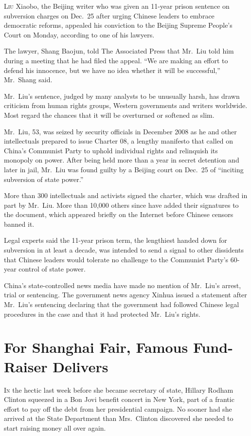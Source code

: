 ﻿\documentclass[12pt]{article}
\begin{document}
\lettrine{L}{iu} Xiaobo, the Beijing writer who was given an 11-year prison
sentence on subversion charges on Dec.~25 after urging Chinese leaders to embrace democratic
reforms, appealed his conviction to the Beijing Supreme People's Court on Monday, according to one
of his lawyers.

The lawyer, Shang Baojun, told The Associated Press that Mr.~Liu told him during a meeting that he
had filed the appeal. ``We are making an effort to defend his innocence, but we have no idea whether
it will be successful,'' Mr.~Shang said.

Mr.~Liu's sentence, judged by many analysts to be unusually harsh, has drawn criticism from human
rights groups, Western governments and writers worldwide. Most regard the chances that it will be
overturned or softened as slim.

Mr.~Liu, 53, was seized by security officials in December 2008 as he and other intellectuals
prepared to issue Charter 08, a lengthy manifesto that called on China's Communist Party to uphold
individual rights and relinquish its monopoly on power. After being held more than a year in secret
detention and later in jail, Mr.~Liu was found guilty by a Beijing court on Dec.~25 of ``inciting
subversion of state power.''

More than 300 intellectuals and activists signed the charter, which was drafted in part by Mr.~Liu.
More than 10,000 others since have added their signatures to the document, which appeared briefly on
the Internet before Chinese censors banned it.

Legal experts said the 11-year prison term, the lengthiest handed down for subversion in at least a
decade, was intended to send a signal to other dissidents that Chinese leaders would tolerate no
challenge to the Communist Party's 60-year control of state power.

China's state-controlled news media have made no mention of Mr.~Liu's arrest, trial or sentencing.
The government news agency Xinhua issued a statement after Mr.~Liu's sentencing declaring that the
government had followed Chinese legal procedures in the case and that it had protected Mr.~Liu's
rights.

\section{For Shanghai Fair, Famous Fund-Raiser Delivers}

\lettrine{I}{n} the hectic last week before she became secretary of state,
Hillary Rodham Clinton squeezed in a Bon Jovi benefit concert in New York, part of a frantic effort
to pay off the debt from her presidential campaign. No sooner had she arrived at the State
Department than Mrs.~Clinton discovered she needed to start raising money all over again.
\end{document}
